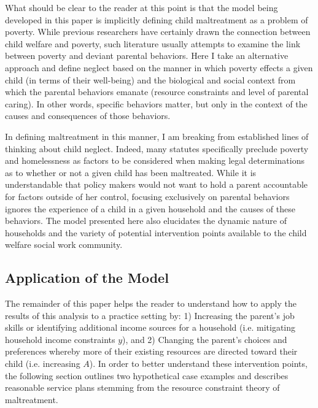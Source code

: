\documentclass[1p, review]{elsarticle}\usepackage[]{graphicx}\usepackage[]{color}
\begin{document}
What should be clear to the reader at this point is that the model being developed in this paper is implicitly defining child maltreatment as a problem of poverty. While previous researchers have certainly drawn the connection between child welfare and poverty, such literature usually attempts to examine the link between poverty and deviant parental behaviors. Here I take an alternative approach and define neglect based on the manner in which poverty effects a given child (in terms of their well-being) and the biological and social context from which the parental behaviors emanate (resource constraints and level of parental caring). In other words, specific behaviors matter, but only in the context of the causes and consequences of those behaviors.

In defining maltreatment in this manner, I am breaking from established lines of thinking about child neglect. Indeed, many statutes specifically preclude poverty and homelessness as factors to be considered when making legal determinations as to whether or not a given child has been maltreated. While it is understandable that policy makers would not want to hold a parent accountable for factors outside of her control, focusing exclusively on parental behaviors ignores the experience of a child in a given household and the causes of these behaviors. The model presented here also elucidates the dynamic nature of households and the variety of potential intervention points available to the child welfare social work community. 

\subsection{Application of the Model}

The remainder of this paper helps the reader to understand how to apply the results of this analysis to a practice setting by: 1) Increasing the parent's job skills or identifying additional income sources for a household (i.e. mitigating household income constraints $y$), and 2) Changing the parent's choices and preferences whereby more of their existing resources are directed toward their child (i.e. increasing $A$). In order to better understand these intervention points, the following section outlines two hypothetical case examples and describes reasonable service plans stemming from the resource constraint theory of maltreatment.
\end{document}
